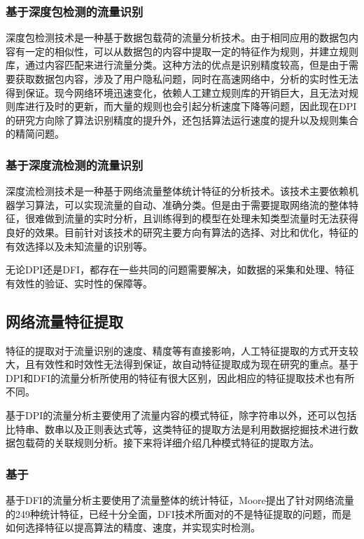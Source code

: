 \documentclass[a4papper]{article}
\begin{document}
\subsubsection{基于深度包检测的流量识别}
\par\setlength{\parindent}{2em} %
深度包检测技术是一种基于数据包载荷的流量分析技术。由于相同应用的数据包内容有一定的相似性，可以从数据包的内容中提取一定的特征作为规则，并建立规则库，通过内容匹配来进行流量分类。这种方法的优点是识别精度较高，但是由于需要获取数据包内容，涉及了用户隐私问题，同时在高速网络中，分析的实时性无法得到保证。现今网络环境迅速变化，依赖人工建立规则库的开销巨大，且无法对规则库进行及时的更新，而大量的规则也会引起分析速度下降等问题，因此现在DPI的研究方向除了算法识别精度的提升外，还包括算法运行速度的提升以及规则集合的精简问题。
\subsubsection{基于深度流检测的流量识别}
\par\setlength{\parindent}{2em} %
深度流检测技术是一种基于网络流量整体统计特征的分析技术。该技术主要依赖机器学习算法，可以实现流量的自动、准确分类。但是由于需要提取网络流的整体特征，很难做到流量的实时分析，且训练得到的模型在处理未知类型流量时无法获得良好的效果。目前针对该技术的研究主要方向有算法的选择、对比和优化，特征的有效选择以及未知流量的识别等。
\par\setlength{\parindent}{2em} %
无论DPI还是DFI，都存在一些共同的问题需要解决，如数据的采集和处理、特征有效性的验证、实时性的保障等。
\subsection{网络流量特征提取}
\par\setlength{\parindent}{2em} %
特征的提取对于流量识别的速度、精度等有直接影响，人工特征提取的方式开支较大，且有效性和时效性无法得到保证，故自动特征提取成为现在研究的重点。基于DPI和DFI的流量分析所使用的特征有很大区别，因此相应的特征提取技术也有所不同。
\par\setlength{\parindent}{2em} %
基于DPI的流量分析主要使用了流量内容的模式特征，除字符串以外，还可以包括比特串、数串以及正则表达式等，这类特征的提取方法是利用数据挖掘技术进行数据包载荷的关联规则分析。接下来将详细介绍几种模式特征的提取方法。
\subsubsection{基于}
\par\setlength{\parindent}{2em} %
基于DFI的流量分析主要使用了流量整体的统计特征，Moore提出了针对网络流量的249种统计特征，已经十分全面，DFI技术所面对的不是特征提取的问题，而是如何选择特征以提高算法的精度、速度，并实现实时检测。
\end{document}
